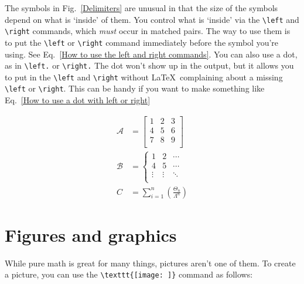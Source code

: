 \documentclass[letterpaper]{article}
\begin{document}
The symbols in Fig.~\ref{Delimiters} are unusual in that the size of the 
symbols depend on what is `inside' of them. You control what is `inside' 
via the \verb+\left+ and \verb+\right+ commands, which \emph{must} occur 
in matched pairs. The way to use them is to put the \verb+\left+ or 
\verb+\right+ command immediately before the symbol you're using.  See 
Eq.~\ref{How to use the left and right commands}.  You can also use a 
dot, as in \verb+\left.+ or \verb+\right.+  The dot won't show up in 
the output, but it allows you to put in the \verb+\left+ and 
\verb+\right+ without \LaTeX\ complaining about a missing \verb+\left+ 
or \verb+\right+.  This can be handy if you want to make something like 
Eq.~\ref{How to use a dot with left or right}

\begin{align}
\label{How to use the left and right commands}
\mathcal{A} & = \left[
    \begin{array}{ccc}
        1 & 2 & 3 \\
        4 & 5 & 6 \\
        7 & 8 & 9 \\
    \end{array}
                        \right] \\
\label{How to use a dot with left or right}
\mathcal{B} & = \left\{
    \begin{array}{ccc}
        1 & 2 & \cdots \\
        4 & 5 & \cdots \\
        \vdots & \vdots & \ddots \\
    \end{array}
                        \right.\\
C & = \sum_{i = 1}^{n}\left(\frac{\Theta_{n}}{\Lambda^{n}}\right)
\end{align}

\section{Figures and graphics}

While pure math is great for many things, pictures aren't one of them.  
To create a picture, you can use the \verb+\texttt{[image: ]}+ command as 
follows:
\end{document}
